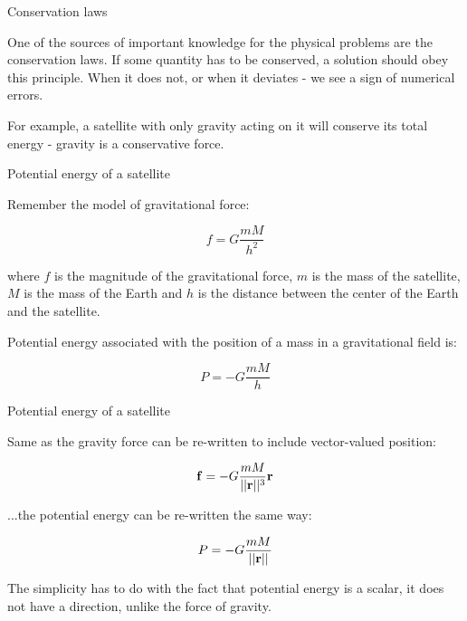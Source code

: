 \documentclass{beamer}
\begin{document}
\begin{frame}{Conservation laws}
	\begin{flushleft}
		
		One of the sources of important knowledge for the physical problems are the conservation laws. If some quantity has to be conserved, a solution should obey this principle. When it does not, or when it deviates - we see a sign of numerical errors.
		
		\bigskip
		
		For example, a satellite with only gravity acting on it will conserve its total energy - gravity is a conservative force. 
		
	\end{flushleft}
\end{frame}



\begin{frame}{Potential energy of a satellite}
	\begin{flushleft}
		
	Remember the model of gravitational force:
		
		\begin{equation}
			f = G \frac{m M}{h^2}
		\end{equation}
	
		where $f$ is the magnitude of the gravitational force, $m$ is the mass of the satellite, $M$ is the mass of the Earth and $h$ is the distance between the center of the Earth and the satellite.
	
		\bigskip
	
		Potential energy associated with the position of a mass in a gravitational field is:
		
		\begin{equation}
			P = -G \frac{m M}{h}
		\end{equation}
		
		
	\end{flushleft}
\end{frame}



\begin{frame}{Potential energy of a satellite}
	\begin{flushleft}
		
		Same as the gravity force can be re-written to include vector-valued position:
		
		\begin{equation}
			\mathbf{f} = -G \frac{m M}{||\mathbf{r}||^3} \mathbf{r}
		\end{equation}		 	 
	
	...the potential energy can be re-written the same way:
	
	\begin{equation}
		P = -G \frac{m M}{||\mathbf{r}||}
	\end{equation}
	
	The simplicity has to do with the fact that potential energy is a scalar, it does not have a direction, unlike the force of gravity.
		
	\end{flushleft}
\end{frame}
\end{document}
